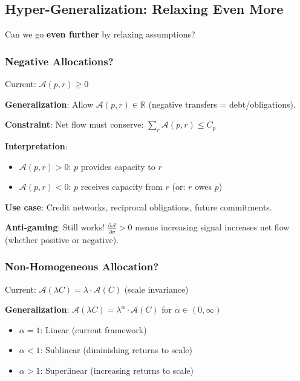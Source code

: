 \documentclass[11pt,a4paper]{article}
\theoremstyle{definition}
\theoremstyle{remark}
\begin{document}
\subsection{Hyper-Generalization: Relaxing Even More}

Can we go \textbf{even further} by relaxing assumptions?

\subsubsection{Negative Allocations?}

Current: $\mathcal{A}(p,r) \ge 0$

\textbf{Generalization}: Allow $\mathcal{A}(p,r) \in \mathbb{R}$ (negative transfers = debt/obligations).

\textbf{Constraint}: Net flow must conserve: $\sum_r \mathcal{A}(p,r) \le C_p$

\textbf{Interpretation}: 
\begin{itemize}
\item $\mathcal{A}(p,r) > 0$: $p$ provides capacity to $r$
\item $\mathcal{A}(p,r) < 0$: $p$ receives capacity from $r$ (or: $r$ owes $p$)
\end{itemize}

\textbf{Use case}: Credit networks, reciprocal obligations, future commitments.

\textbf{Anti-gaming}: Still works! $\frac{\partial \mathcal{A}}{\partial \sigma} > 0$ means increasing signal increases net flow (whether positive or negative).

\subsubsection{Non-Homogeneous Allocation?}

Current: $\mathcal{A}(\lambda C) = \lambda \cdot \mathcal{A}(C)$ (scale invariance)

\textbf{Generalization}: $\mathcal{A}(\lambda C) = \lambda^\alpha \cdot \mathcal{A}(C)$ for $\alpha \in (0, \infty)$

\begin{itemize}
\item $\alpha = 1$: Linear (current framework)
\item $\alpha < 1$: Sublinear (diminishing returns to scale)
\item $\alpha > 1$: Superlinear (increasing returns to scale)
\end{itemize}
\end{document}
